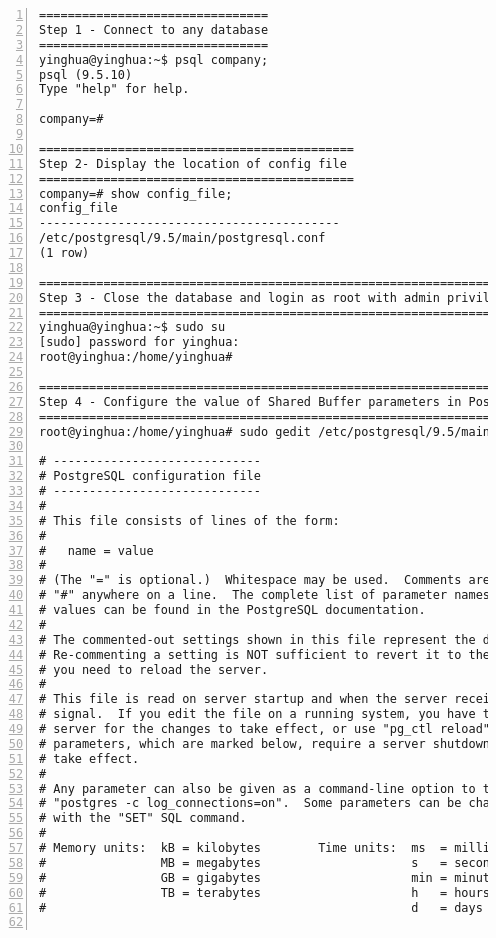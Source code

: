 \lstset{basicstyle=\ttfamily\tiny}  
\begin{lstlisting}[breaklines, frame=single, numbers=left, caption={Increase Shared Buffer utilized by PostgreSQL Database}, label=commandline-02]
================================
Step 1 - Connect to any database 
================================
yinghua@yinghua:~$ psql company; 
psql (9.5.10)
Type "help" for help.

company=# 

============================================
Step 2- Display the location of config file 
============================================
company=# show config_file;
config_file                
------------------------------------------
/etc/postgresql/9.5/main/postgresql.conf
(1 row)

==================================================================================
Step 3 - Close the database and login as root with admin privileges on Ubuntu OS 
==================================================================================
yinghua@yinghua:~$ sudo su 
[sudo] password for yinghua: 
root@yinghua:/home/yinghua# 

==================================================================================
Step 4 - Configure the value of Shared Buffer parameters in PostgreSQL Configuration file
==================================================================================
root@yinghua:/home/yinghua# sudo gedit /etc/postgresql/9.5/main/postgresql.conf

# -----------------------------
# PostgreSQL configuration file
# -----------------------------
#
# This file consists of lines of the form:
#
#   name = value
#
# (The "=" is optional.)  Whitespace may be used.  Comments are introduced with
# "#" anywhere on a line.  The complete list of parameter names and allowed
# values can be found in the PostgreSQL documentation.
#
# The commented-out settings shown in this file represent the default values.
# Re-commenting a setting is NOT sufficient to revert it to the default value;
# you need to reload the server.
#
# This file is read on server startup and when the server receives a SIGHUP
# signal.  If you edit the file on a running system, you have to SIGHUP the
# server for the changes to take effect, or use "pg_ctl reload".  Some
# parameters, which are marked below, require a server shutdown and restart to
# take effect.
#
# Any parameter can also be given as a command-line option to the server, e.g.,
# "postgres -c log_connections=on".  Some parameters can be changed at run time
# with the "SET" SQL command.
#
# Memory units:  kB = kilobytes        Time units:  ms  = milliseconds
#                MB = megabytes                     s   = seconds
#                GB = gigabytes                     min = minutes
#                TB = terabytes                     h   = hours
#                                                   d   = days


\end{lstlisting}
